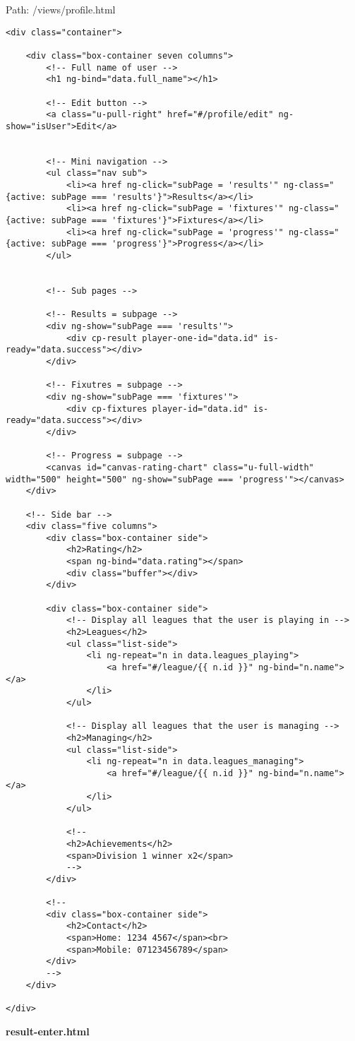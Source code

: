 Path: /views/profile.html
{\scriptsize
\begin{lstlisting}
<div class="container">

	<div class="box-container seven columns">
		<!-- Full name of user -->
		<h1 ng-bind="data.full_name"></h1>

		<!-- Edit button -->
		<a class="u-pull-right" href="#/profile/edit" ng-show="isUser">Edit</a>


		<!-- Mini navigation -->
		<ul class="nav sub">
			<li><a href ng-click="subPage = 'results'" ng-class="{active: subPage === 'results'}">Results</a></li>
			<li><a href ng-click="subPage = 'fixtures'" ng-class="{active: subPage === 'fixtures'}">Fixtures</a></li>
			<li><a href ng-click="subPage = 'progress'" ng-class="{active: subPage === 'progress'}">Progress</a></li>
		</ul>


		<!-- Sub pages -->

		<!-- Results = subpage -->
		<div ng-show="subPage === 'results'">
			<div cp-result player-one-id="data.id" is-ready="data.success"></div>
		</div>

		<!-- Fixutres = subpage -->
		<div ng-show="subPage === 'fixtures'">
			<div cp-fixtures player-id="data.id" is-ready="data.success"></div>
		</div>

		<!-- Progress = subpage -->
		<canvas id="canvas-rating-chart" class="u-full-width" width="500" height="500" ng-show="subPage === 'progress'"></canvas>
	</div>

	<!-- Side bar -->
	<div class="five columns">
		<div class="box-container side">
			<h2>Rating</h2>
			<span ng-bind="data.rating"></span>
			<div class="buffer"></div>
		</div>

		<div class="box-container side">
			<!-- Display all leagues that the user is playing in -->
			<h2>Leagues</h2>
			<ul class="list-side">
				<li ng-repeat="n in data.leagues_playing">
					<a href="#/league/{{ n.id }}" ng-bind="n.name"></a>
				</li>
			</ul>

			<!-- Display all leagues that the user is managing -->
			<h2>Managing</h2>
			<ul class="list-side">
				<li ng-repeat="n in data.leagues_managing">
					<a href="#/league/{{ n.id }}" ng-bind="n.name"></a>
				</li>
			</ul>

			<!--
			<h2>Achievements</h2>
			<span>Division 1 winner x2</span>
			-->
		</div>

		<!--
		<div class="box-container side">
			<h2>Contact</h2>
			<span>Home: 1234 4567</span><br>
			<span>Mobile: 07123456789</span>
		</div>
		-->
	</div>

</div>\end{lstlisting}
}
\textbf{result-enter.html}\label{result-enter.html}


